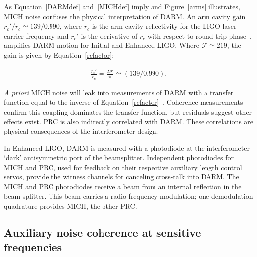         As Equation~\ref{DARMdef} and~\ref{MICHdef} imply and Figure~\ref{arms} illustrates, MICH noise confuses the physical interpretation of DARM. An arm cavity gain $r_{c}'/r_c \simeq 139/0.990$, where $r_c$ is the arm cavity reflectivity for the LIGO laser carrier frequency and $r_{c}'$ is the derivative of $r_c$ with respect to round trip phase~\cite{ReadoutGWA,BallmerThesis}, amplifies DARM motion for Initial and Enhanced LIGO. Where $\mathcal{F} \simeq 219$, the gain is given by Equation~\ref{rcfactor}:

        \begin{eqnarray}
        \frac{r_{c}'}{r_c} = \frac{2 \mathcal{F}}{\pi} \simeq (139/0.990). \label{rcfactor}
        \end{eqnarray}

        \textit{A priori} MICH noise will leak into measurements of DARM with a transfer function equal to the inverse of Equation~\ref{rcfactor}~\cite{SiggFreq1997}. Coherence measurements confirm this coupling dominates the transfer function, but residuals suggest other effects exist. PRC is also indirectly correlated with DARM. These correlations are physical consequences of the interferometer design. 

In Enhanced LIGO, DARM is measured with a photodiode at the interferometer `dark' antisymmetric port of the beamsplitter. Independent photodiodes for MICH and PRC, used for feedback on their respective auxiliary length control servos, provide the witness channels for canceling cross-talk into DARM. The MICH and PRC photodiodes receive a beam from an internal reflection in the beam-splitter. This beam carries a radio-frequency modulation; one demodulation quadrature provides MICH, the other PRC.

        \subsection{Auxiliary noise coherence at sensitive frequencies}
        \label{aux_noise}

